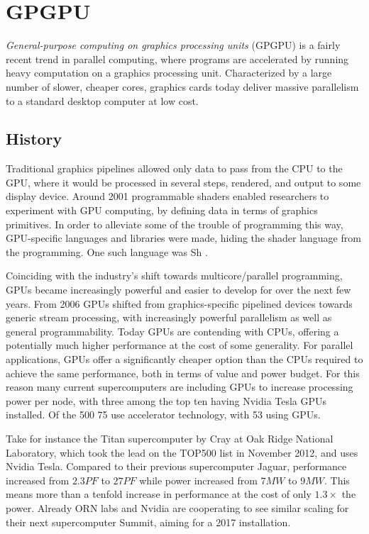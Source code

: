 \section{GPGPU}
\emph{General-purpose computing on graphics processing units} (GPGPU) is a fairly recent trend in parallel computing,
where programs are accelerated by running heavy computation on a graphics processing unit. Characterized by a large
number of slower, cheaper cores, graphics cards today deliver massive parallelism to a standard desktop computer at low
cost.

\subsection{History}
Traditional graphics pipelines allowed only data to pass from the CPU to the GPU, where it would be processed in several
steps, rendered, and output to some display device. Around 2001 programmable shaders enabled researchers to experiment
with GPU computing, by defining data in terms of graphics primitives. In order to alleviate some of the trouble of
programming this way, GPU-specific languages and libraries were made, hiding the shader language from the programming.
One such language was Sh \cite{libsh}.

Coinciding with the industry's shift towards multicore/parallel programming, GPUs became increasingly powerful and easier
to develop for over the next few years. From 2006 GPUs shifted from graphics-specific pipelined devices towards generic
stream processing, with increasingly powerful parallelism as well as general programmability. Today GPUs are contending
with CPUs, offering a potentially much higher performance at the cost of some generality. For parallel applications, GPUs
offer a significantly cheaper option than the CPUs required to achieve the same performance, both in terms of value and
power budget. For this reason many current supercomputers are including GPUs to increase processing power per node,
with three among the top ten having Nvidia Tesla GPUs installed\cite{top500}. Of the 500
75 use accelerator technology, with 53 using GPUs.

Take for instance the Titan supercomputer by Cray at Oak Ridge National Laboratory, which took the lead on the TOP500 list in
November 2012, and uses Nvidia Tesla. Compared to their previous supercomputer Jaguar, performance increased from $2.3PF$
to $27PF$ while power increased from $7MW$ to $9MW$.\cite{nvidiasc14intro} This means more than a tenfold increase in performance at the cost
of only $1.3\times$ the power. Already ORN labs and Nvidia are cooperating to see similar scaling for their next
supercomputer Summit, aiming for a 2017 installation\cite{nvidiasc14intro}.

